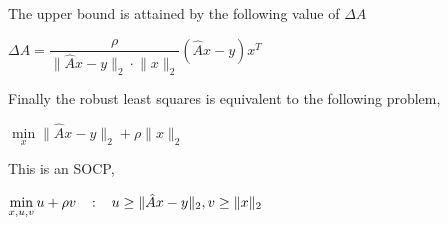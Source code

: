 \documentclass[twoside]{article}
\begin{document}
The upper bound is attained by the following value of \(\Delta A\)

\centerline {\(\Delta A = \dfrac{\rho}{\lVert \hat{A} x - y\rVert_2 \cdot \lVert x \rVert_2} (\hat{A}x-y)x^T \) }

Finally the robust least squares is equivalent to the following problem,

\centerline {\(\min\limits_{x} \lVert \hat{A} x - y\rVert_2 + \rho \lVert x \rVert_2 \)}

This is an SOCP,

\centerline{ \(\min\limits_{x,u,v} u + \rho v \hspace{3mm} : \hspace{3mm} u \geq \lVert \hat{A} x - y\rVert_2, v\geq \lVert x \rVert_2\)}
\end{document}
